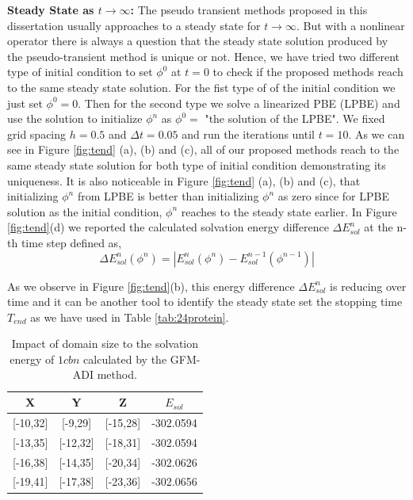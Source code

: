 {\bf Steady State as $t\rightarrow \infty$:} The pseudo transient methods proposed in this dissertation usually approaches to a steady state for $t\rightarrow \infty$. But with a nonlinear operator there is always a question that the steady state solution produced by the pseudo-transient method is unique or not. 
Hence, we have tried two different type of initial condition to set $\phi^0$ at $t=0$ to check if the proposed methods reach to the same steady state solution. For the fist type of of the initial condition we just set $\phi^0=0$. Then for the second type we solve a linearized PBE (LPBE) \cite{Zhao2011} and use the solution to initialize $\phi^n$ as $\phi^0 = $ "the solution of the LPBE". We fixed grid spacing $h = 0.5$ and $\Delta t = 0.05$ and run the iterations until $t = 10$.
As we can see in Figure \ref{fig:tend} (a), (b) and (c), all of our proposed methods reach to the same steady state solution for both type of initial condition demonstrating its uniqueness. It is also noticeable in Figure \ref{fig:tend} (a), (b) and (c), that initializing $\phi^n$ from LPBE is better than initializing $\phi^n$ as zero since for LPBE solution as the initial condition, $\phi^n$ reaches to the steady state earlier.     
  In Figure \ref{fig:tend}(d) we reported the calculated solvation energy difference $\Delta E^n_{sol}$ at the n-th time step defined as,
\begin{equation}
	\Delta E^n_{sol}(\phi^n)= |E^n_{sol}(\phi^n)-E^{n-1}_{sol}(\phi^{n-1})|
\end{equation}      

As we observe in Figure \ref{fig:tend}(b), this energy difference $\Delta E^n_{sol}$ is reducing over time and it can be another tool to identify the steady state set the stopping time $T_{end}$ as we have used in Table \ref{tab:24protein}.
\begin{table}[!ht]
\begin{center}
\begin{tabular}{c c c c }
\hline
X            & Y            & Z            & $E_{sol}$    \\ \hline
{[}-10,32{]} & {[}-9,29{]}  & {[}-15,28{]} & -302.0594 \\ \hline
{[}-13,35{]} & {[}-12,32{]} & {[}-18,31{]} & -302.0594\\ \hline
{[}-16,38{]} & {[}-14,35{]} & {[}-20,34{]} & -302.0626 \\ \hline
{[}-19,41{]} & {[}-17,38{]} & {[}-23,36{]} & -302.0656\\ \hline
\end{tabular}
\end{center}
\caption{Impact of domain size to the solvation energy of $1cbn$ calculated by the GFM-ADI method.}
\label{tab:domain}
\end{table}

